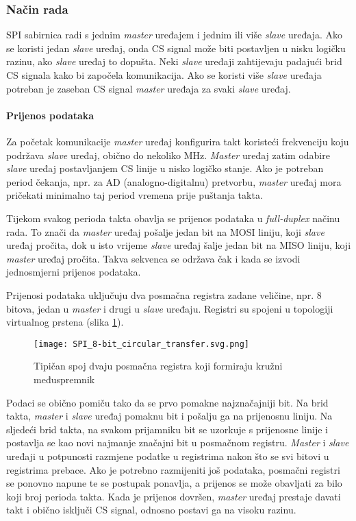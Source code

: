 \subsubsection{Način rada}

SPI sabirnica radi s jednim \textit{master} uređajem i jednim ili više \textit{slave} uređaja. Ako se koristi jedan \textit{slave} uređaj, onda CS signal može biti postavljen u nisku logičku razinu, ako \textit{slave} uređaj to dopušta. Neki \textit{slave} uređaji zahtijevaju padajući brid CS signala kako bi započela komunikacija. Ako se koristi više \textit{slave} uređaja potreban je zaseban CS signal \textit{master} uređaja za svaki \textit{slave} uređaj.

\paragraph{Prijenos podataka}

Za početak komunikacije \textit{master} uređaj konfigurira takt koristeći frekvenciju koju podržava \textit{slave} uređaj, obično do nekoliko MHz. \textit{Master} uređaj zatim odabire \textit{slave} uređaj postavljanjem CS linije u nisko logičko stanje. Ako je potreban period čekanja, npr. za AD (analogno-digitalnu) pretvorbu, \textit{master} uređaj mora pričekati minimalno taj period vremena prije puštanja takta.

Tijekom svakog perioda takta obavlja se prijenos podataka u \textit{full-duplex} načinu rada. To znači da \textit{master} uređaj pošalje jedan bit na MOSI liniju, koji \textit{slave} uređaj pročita, dok u isto vrijeme \textit{slave} uređaj šalje jedan bit na MISO liniju, koji \textit{master} uređaj pročita. Takva sekvenca se održava čak i kada se izvodi jednosmjerni prijenos podataka.

Prijenosi podataka uključuju dva posmačna registra zadane veličine, npr. 8 bitova, jedan u \textit{master} i drugi u \textit{slave} uređaju. Registri su spojeni u topologiji virtualnog prstena (slika \ref{fig:spi_circular_transfer}).
\begin{figure}[H]
	\centering
	\texttt{[image: SPI\_8-bit\_circular\_transfer.svg.png]}
	\caption{Tipičan spoj dvaju posmačna registra koji formiraju kružni međuspremnik \cite{spi_wikipedia}}
	\label{fig:spi_circular_transfer}
\end{figure}
Podaci se obično pomiču tako da se prvo pomakne najznačajniji bit. Na brid takta, \textit{master} i \textit{slave} uređaj pomaknu bit i pošalju ga na prijenosnu liniju. Na sljedeći brid takta, na svakom prijamniku bit se uzorkuje s prijenosne linije i postavlja se kao novi najmanje značajni bit u posmačnom registru. \textit{Master} i \textit{slave} uređaji u potpunosti razmjene podatke u registrima nakon što se svi bitovi u registrima prebace. Ako je potrebno razmijeniti još podataka, posmačni registri se ponovno napune te se postupak ponavlja, a prijenos se može obavljati za bilo koji broj perioda takta. Kada je prijenos dovršen, \textit{master} uređaj prestaje davati takt i obično isključi CS signal, odnosno postavi ga na visoku razinu.


